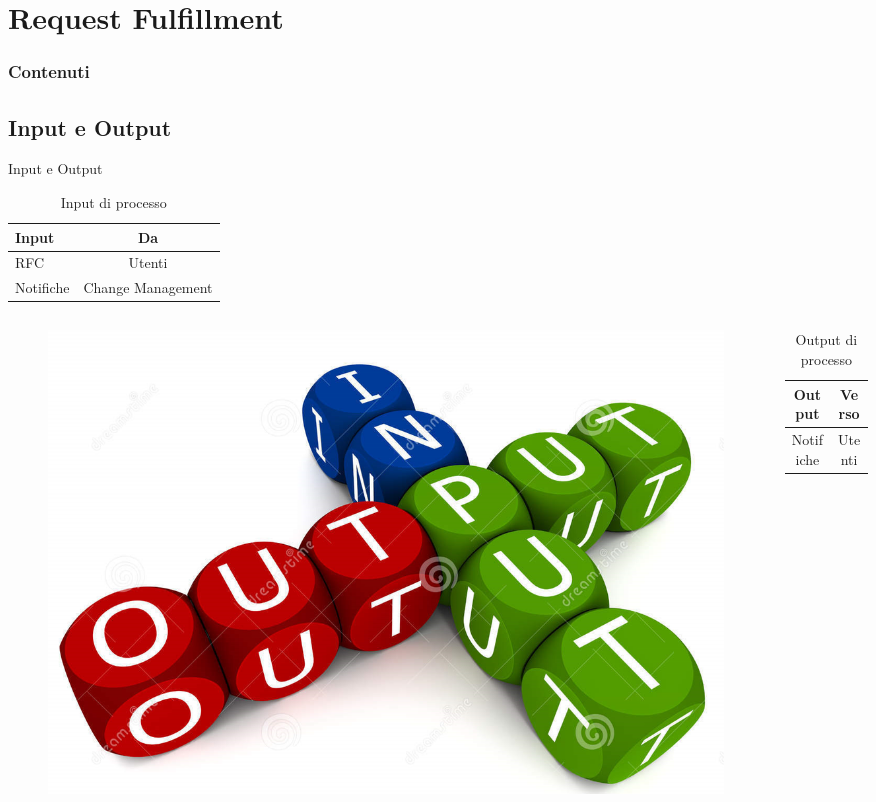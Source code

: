 %
\section{Request Fulfillment}
\frame
{
\frametitle{Contenuti}
\tableofcontents[currentsection]
\addtocounter{framenumber}{-1}
}

\subsection*{Input e Output}
\begin{frame}{Input e Output}
\begin{table}
\begin{tabular}{ l | c }
\textbf{Input} & \textbf{Da}\\
\hline
RFC & Utenti\\
Notifiche & Change Management\\
\end{tabular}
\caption{Input di processo}
\end{table}
\begin{columns}
\begin{column}{0.3\textwidth}
\begin{figure}
\includegraphics[scale=0.1]{Images/Input_output.png}
\end{figure}
\end{column}
\begin{column}{0.7\textwidth}
\begin{table}
\begin{tabular}{ c | c }
\textbf{Output} & \textbf{Verso}\\
\hline
Notifiche & Utenti\\
\end{tabular}
\caption{Output di processo}
\end{table}
\end{column}
\end{columns}
\end{frame}

